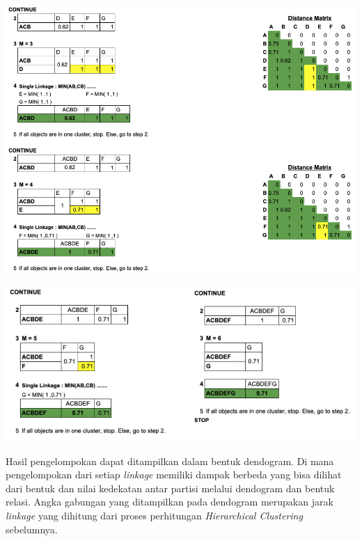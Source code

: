 \begin{center}
	\includegraphics[width=14cm]{img/bab_3/hc_detail_3.png}
	\label{fig:hc_detail_3}
\end{center}

\begin{center}
	\includegraphics[width=14cm]{img/bab_3/hc_detail_4.png}
	\label{fig:hc_detail_4}
\end{center}

Hasil pengelompokan dapat ditampilkan dalam bentuk dendogram.  Di mana pengelompokan dari setiap \textit{linkage} memiliki dampak berbeda yang bisa dilihat dari bentuk dan nilai kedekatan antar partisi melalui dendogram dan bentuk relasi. Angka gabungan yang ditampilkan pada dendogram merupakan jarak \textit{linkage} yang dihitung dari proses perhitungan \textit{Hierarchical Clustering} sebelumnya.


